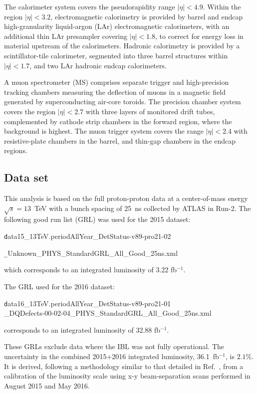 The calorimeter system covers the pseudorapidity range $| \eta | < 4.9$. Within the region $| \eta | < 3.2$, electromagnetic calorimetry is provided by barrel and endcap high-granularity liquid-argon (LAr) electromagnetic calorimeters, with an additional thin LAr presampler covering $| \eta | < 1.8$, to correct for energy loss in material upstream of the calorimeters. Hadronic calorimetry is provided by a scintillator-tile calorimeter, segmented into three barrel structures within $| \eta | < 1.7$, and two LAr hadronic endcap calorimeters.

A muon spectrometer (MS) comprises separate trigger and high-precision tracking chambers measuring the deflection of muons in a magnetic field generated by superconducting air-core toroids. The precision chamber system covers the region $| \eta |< 2.7$ with three layers of monitored drift tubes, complemented by cathode strip chambers in the forward region, where the background is highest. The muon trigger system covers the range $| \eta | < 2.4$ with resistive-plate chambers in the barrel, and thin-gap chambers in the endcap regions.

\subsection{Data set}
\label{sec:dataset}

This analysis is based on the full proton-proton data at a center-of-mass energy $\sqrt{s}=13$~TeV with a bunch spacing of 25~ns collected by ATLAS in Run-2. The following good run list (GRL) was used for the 2015 dataset:

\begin{centering}
{\texttt data15\_13TeV.periodAllYear\_DetStatus-v89-pro21-02}

{\texttt \_Unknown\_PHYS\_StandardGRL\_All\_Good\_25ns.xml}

\end{centering}
which corresponds to an integrated luminosity of 3.22 fb$^{-1}$.

The GRL used for the 2016 dataset:

\begin{centering}
{\texttt data16\_13TeV.periodAllYear\_DetStatus-v89-pro21-01\\\_DQDefects-00-02-04\_PHYS\_StandardGRL\_All\_Good\_25ns.xml}

\end{centering}
corresponds to an integrated luminosity of 32.88 fb$^{-1}$.

These GRLs exclude data where the IBL was not fully operational. The uncertainty in the combined 2015+2016 integrated luminosity, 36.1~fb$^{-1}$, is $2.1\%$. It is derived, following a methodology similar to that detailed in Ref.~\cite{DAPR-2013-01}, from a calibration of the luminosity scale using x-y beam-separation scans performed in August 2015 and May 2016.


